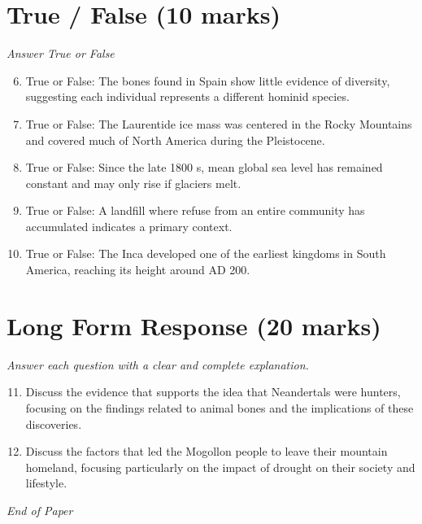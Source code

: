 \documentclass[12pt]{article}
\begin{document}
\section*{True / False (10 marks)}
\textit{Answer True or False}
\begin{enumerate}[label=\arabic*.]
\setcounter{enumi}{5}
\item True or False: The bones found in Spain show little evidence of diversity, suggesting each individual represents a different hominid species.
\item True or False: The Laurentide ice mass was centered in the Rocky Mountains and covered much of North America during the Pleistocene.
\item True or False: Since the late 1800 s, mean global sea level has remained constant and may only rise if glaciers melt.
\item True or False: A landfill where refuse from an entire community has accumulated indicates a primary context.
\item True or False: The Inca developed one of the earliest kingdoms in South America, reaching its height around AD 200.
\end{enumerate}

\section*{Long Form Response (20 marks)}
\textit{Answer each question with a clear and complete explanation.}
\begin{enumerate}[label=\arabic*.]
\setcounter{enumi}{10}
\item Discuss the evidence that supports the idea that Neandertals were hunters, focusing on the findings related to animal bones and the implications of these discoveries.
\item Discuss the factors that led the Mogollon people to leave their mountain homeland, focusing particularly on the impact of drought on their society and lifestyle.
\end{enumerate}

\vfill
\noindent\textit{End of Paper}
\end{document}
